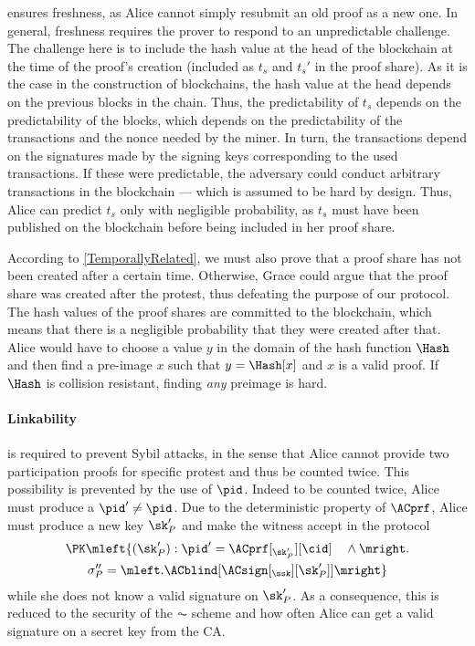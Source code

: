 ensures freshness, as Alice cannot simply resubmit an old proof as a new one.
In general, freshness requires the prover to respond to an unpredictable challenge.
The challenge here is to include the hash value at the head of the blockchain at the time of the proof's creation (included as \(t_s\) and \(t_s'\) in the proof share).
As it is the case in the construction of blockchains, the hash value at the head depends on the previous blocks in the chain.
Thus, the predictability of \(t_s\) depends on the predictability of the blocks, which depends on the predictability of the transactions and the nonce needed by the miner.
In turn, the transactions depend on the signatures made by the signing keys corresponding to the used transactions.
If these were predictable, the adversary could conduct arbitrary transactions in the blockchain --- which is assumed to be hard by design.
Thus, Alice can predict \(t_s\) only with negligible probability, as \(t_s\) must have been published on the blockchain before being included in her proof share.

According to \cref{TemporallyRelated}, we must also prove that a proof share has not been created after a certain time.
Otherwise, Grace could argue that the proof share was created after the protest, thus defeating the purpose of our protocol.
The hash values of the proof shares are committed to the blockchain, which means that there is a negligible probability that they were created after that.
Alice would have to choose a value \(y\) in the domain of the hash function \(\Hash\) and then find a pre-image \(x\) such that \(y = \Hash[x]\) and \(x\) is a valid proof.
If \(\Hash\) is collision resistant, finding \emph{any} preimage is hard.

\paragraph{Linkability}
\label{analysis-linkability}

 is required to prevent Sybil attacks, in the sense that Alice cannot provide two participation proofs for specific protest and thus be counted twice.
This possibility is prevented by the use of \(\pid\).
Indeed to be counted twice, Alice must produce a \(\pid'\neq \pid\).
Due to the deterministic property of \(\ACprf\), Alice must produce a new key \(\sk_P'\) and make the witness accept in the protocol
\begin{multline*}
\PK\mleft\{ (\sk_P') : \pid' = \ACprf[_{\sk_P'}][\cid] \quad \land \mright. \\
    \sigma_P'' = \mleft. \ACblind[\ACsign[_{\ssk}][\sk_P']] \mright\}
\end{multline*}
while she does not know a valid signature on \(\sk_P'\).
As a consequence, this is reduced to the security of the \(\AC\) scheme and how often Alice can get a valid signature on a secret key from the \ac{CA}.

